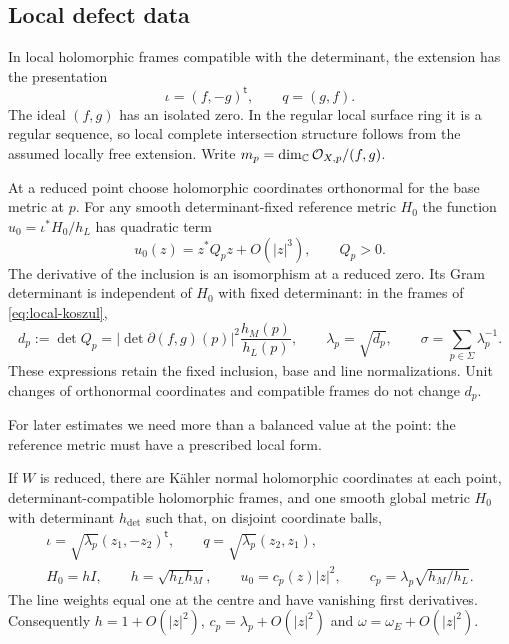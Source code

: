 \subsection{Local defect data}

In local holomorphic frames compatible with the determinant, the
extension has the presentation
\begin{equation}\label{eq:local-koszul}
             \iota=(f,-g)^{\mathsf t},\qquad q=(g,f).
\end{equation}
The ideal $(f,g)$ has an isolated zero. In the regular local
surface ring it is a regular sequence, so local complete
intersection structure follows from the assumed locally free
extension. Write $m_p=\dim_\mathbb C\mathcal O_{X,p}/(f,g)$.

At a reduced point choose holomorphic coordinates orthonormal
for the base metric at $p$. For any smooth determinant-fixed
reference metric $H_0$ the function $u_0=\iota^*H_0/h_L$ has
quadratic term
\[
                  u_0(z)=z^*Q_pz+O(|z|^3),
                  \qquad Q_p>0 .
\]
The derivative of the inclusion is an isomorphism at a reduced
zero. Its Gram determinant is independent of $H_0$ with fixed
determinant: in the frames of \eqref{eq:local-koszul},
\begin{equation}\label{eq:defect-constants}
 d_p:=\det Q_p
       =|\det\partial(f,g)(p)|^2\frac{h_M(p)}{h_L(p)},
 \qquad
 \lambda_p=\sqrt{d_p},\qquad
 \sigma=\sum_{p\in\Sigma}\lambda_p^{-1}.
\end{equation}
These expressions retain the fixed inclusion, base and line
normalizations. Unit changes of orthonormal coordinates and
compatible frames do not change $d_p$.

For later estimates we need more than a balanced value at the
point: the reference metric must have a prescribed local form.

\begin{lemma}\label{lem:normalized-reference}
If $W$ is reduced, there are K\"ahler normal holomorphic
coordinates at each point, determinant-compatible holomorphic
frames, and one smooth global metric $H_0$ with determinant
$h_{\det}$ such that, on disjoint coordinate balls,
\begin{equation}\label{eq:normal-reference}
 \begin{gathered}
 \iota=\sqrt{\lambda_p}(z_1,-z_2)^{\mathsf t},\qquad
 q=\sqrt{\lambda_p}(z_2,z_1),\\
 H_0=hI,\qquad h=\sqrt{h_Lh_M},\qquad
 u_0=c_p(z)|z|^2,\qquad
 c_p=\lambda_p\sqrt{h_M/h_L}.
 \end{gathered}
\end{equation}
The line weights equal one at the centre and have vanishing
first derivatives. Consequently
$h=1+O(|z|^2)$, $c_p=\lambda_p+O(|z|^2)$ and
$\omega=\omega_E+O(|z|^2)$.
\end{lemma}

